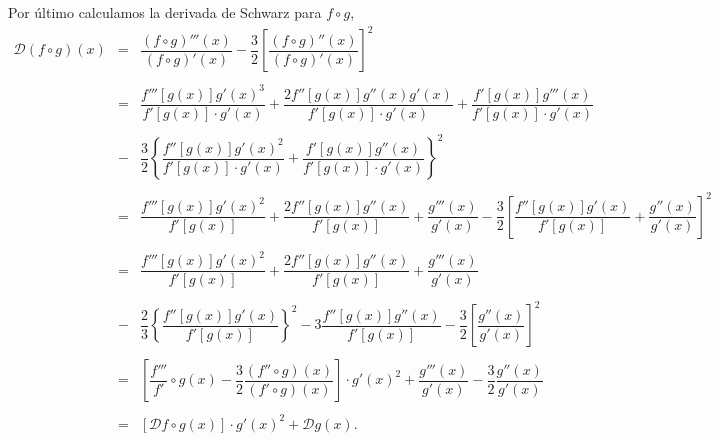 \begin{enumerate}[\bfseries 1.]
\begin{enumerate}[(a)]
		 Por último calculamos la derivada de Schwarz para $f\circ g$,
		 $$\begin{array}{rcl}
		     \mathscr{D}(f\circ g)(x)&=&\dfrac{(f\circ g)'''(x)}{(f\circ g)'(x)}-\dfrac{3}{2}\left[\dfrac{(f\circ g)''(x)}{(f\circ g)'(x)}\right]^2\\\\
					     &=&\dfrac{f'''\left[g(x)\right]g'(x)^3}{f'\left[g(x)\right]\cdot g'(x)}+\dfrac{2f''\left[g(x)\right]g''(x)g'(x)}{f'\left[g(x)\right]\cdot g'(x)}+\dfrac{f'\left[g(x)\right]g'''(x)}{f'\left[g(x)\right]\cdot g'(x)}\\\\
					     &-&\dfrac{3}{2}\left\{\dfrac{f''\left[g(x)\right]g'(x)^2}{f'\left[g(x)\right]\cdot g'(x)}+\dfrac{f'\left[g(x)\right]g''(x)}{f'\left[g(x)\right]\cdot g'(x)}\right\}^2\\\\
					     &=&\dfrac{f'''\left[g(x)\right]g'(x)^2}{f'\left[g(x)\right]}+\dfrac{2f''\left[g(x)\right]g''(x)}{f'\left[g(x)\right]}+\dfrac{g'''(x)}{g'(x)}-\dfrac{3}{2}\left[\dfrac{f''\left[g(x)\right]g'(x)}{f'\left[g(x)\right]}+\dfrac{g''(x)}{g'(x)}\right]^2\\\\
					     &=&\dfrac{f'''\left[g(x)\right]g'(x)^2}{f'\left[g(x)\right]}+\dfrac{2f''\left[g(x)\right]g''(x)}{f'\left[g(x)\right]}+\dfrac{g'''(x)}{g'(x)}\\\\
					     &-&\dfrac{2}{3}\left\{\dfrac{f''\left[g(x)\right]g'(x)}{f'\left[g(x)\right]}\right\}^2-3\dfrac{f''\left[g(x)\right]g''(x)}{f'\left[g(x)\right]}-\dfrac{3}{2}\left[\dfrac{g''(x)}{g'(x)}\right]^2\\\\
					     &=&\left[\dfrac{f'''}{f'}\circ g(x)-\dfrac{3}{2}\dfrac{(f''\circ g)(x)}{(f'\circ g)(x)}\right]\cdot g'(x)^2+\dfrac{g'''(x)}{g'(x)}-\dfrac{3}{2}\dfrac{g''(x)}{g'(x)}\\\\
					     &=&\left[\mathscr{D}f\circ g(x)\right]\cdot g'(x)^2+\mathscr{D}g(x).\\\\
		 \end{array}$$
		 \vspace{.5cm}


\end{enumerate}
\end{enumerate}
